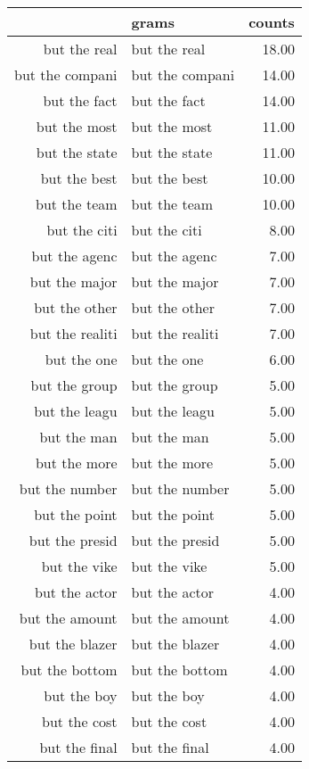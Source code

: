 \begin{table}[ht]
\centering
\begin{tabular}{rlr}
  \hline
 & grams & counts \\ 
  \hline
but the real & but the real & 18.00 \\ 
  but the compani & but the compani & 14.00 \\ 
  but the fact & but the fact & 14.00 \\ 
  but the most & but the most & 11.00 \\ 
  but the state & but the state & 11.00 \\ 
  but the best & but the best & 10.00 \\ 
  but the team & but the team & 10.00 \\ 
  but the citi & but the citi & 8.00 \\ 
  but the agenc & but the agenc & 7.00 \\ 
  but the major & but the major & 7.00 \\ 
  but the other & but the other & 7.00 \\ 
  but the realiti & but the realiti & 7.00 \\ 
  but the one & but the one & 6.00 \\ 
  but the group & but the group & 5.00 \\ 
  but the leagu & but the leagu & 5.00 \\ 
  but the man & but the man & 5.00 \\ 
  but the more & but the more & 5.00 \\ 
  but the number & but the number & 5.00 \\ 
  but the point & but the point & 5.00 \\ 
  but the presid & but the presid & 5.00 \\ 
  but the vike & but the vike & 5.00 \\ 
  but the actor & but the actor & 4.00 \\ 
  but the amount & but the amount & 4.00 \\ 
  but the blazer & but the blazer & 4.00 \\ 
  but the bottom & but the bottom & 4.00 \\ 
  but the boy & but the boy & 4.00 \\ 
  but the cost & but the cost & 4.00 \\ 
  but the final & but the final & 4.00 \\ 

\end{tabular}
\end{table}

